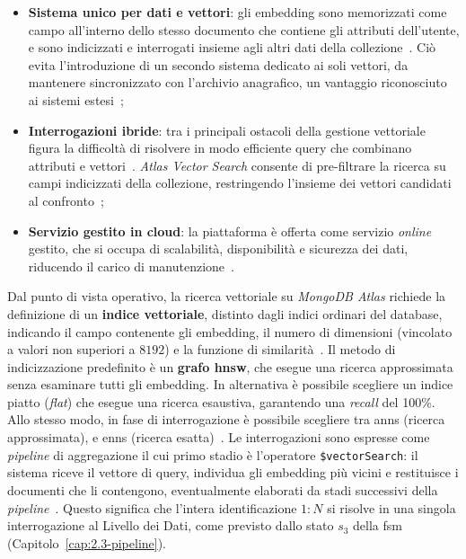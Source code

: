 \begin{itemize}
    \item \textbf{Sistema unico per dati e vettori}: gli embedding sono memorizzati come campo all'interno dello stesso documento che contiene gli attributi dell'utente, e sono indicizzati e interrogati insieme agli altri dati della collezione~\cite{MongoDBVectorSearch}. Ciò evita l'introduzione di un secondo sistema dedicato ai soli vettori, da mantenere sincronizzato con l'archivio anagrafico, un vantaggio riconosciuto ai sistemi estesi~\cite{panSurveyVectorDatabase2023};
    \item \textbf{Interrogazioni ibride}: tra i principali ostacoli della gestione vettoriale figura la difficoltà di risolvere in modo efficiente query che combinano attributi e vettori~\cite{panSurveyVectorDatabase2023}. \textit{Atlas Vector Search} consente di pre-filtrare la ricerca su campi indicizzati della collezione, restringendo l'insieme dei vettori candidati al confronto~\cite{MongoDBVectorSearch};
    \item \textbf{Servizio gestito in cloud}: la piattaforma è offerta come servizio \textit{online} gestito, che si occupa di scalabilità, disponibilità e sicurezza dei dati, riducendo il carico di manutenzione~\cite{MongoDBVectorSearch}.
\end{itemize}
Dal punto di vista operativo, la ricerca vettoriale su \textit{MongoDB Atlas} richiede la definizione di un \textbf{indice vettoriale}, distinto dagli indici ordinari del database, indicando il campo contenente gli embedding, il numero di dimensioni (vincolato a valori non superiori a $8192$) e la funzione di similarità~\cite{MongoDBVectorSearch}. 
Il metodo di indicizzazione predefinito è un \textbf{grafo \gls{hnsw}}, che esegue una ricerca approssimata senza esaminare tutti gli embedding. In alternativa è possibile scegliere un indice piatto (\textit{flat}) che esegue una ricerca esaustiva, garantendo una \textit{recall} del 100\%. 
Allo stesso modo, in fase di interrogazione è possibile scegliere tra \gls{anns} (ricerca approssimata), e \gls{enns} (ricerca esatta)~\cite{MongoDBVectorSearch}. 
Le interrogazioni sono espresse come \textit{pipeline} di aggregazione il cui primo stadio è l'operatore \texttt{\$vectorSearch}: il sistema riceve il vettore di query, individua gli embedding più vicini e restituisce i documenti che li contengono, eventualmente elaborati da stadi successivi della \textit{pipeline}~\cite{MongoDBVectorSearch}. 
Questo significa che l'intera identificazione $1:N$ si risolve in una singola interrogazione al Livello dei Dati, come previsto dallo stato $s_3$ della \gls{fsm} (Capitolo~\ref{cap:2.3-pipeline}).

